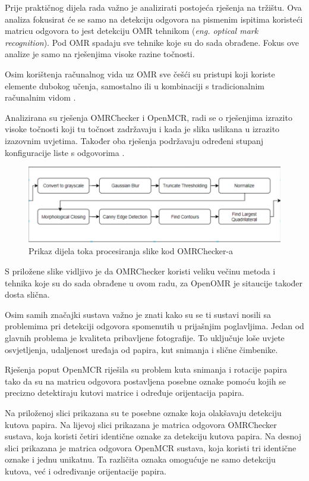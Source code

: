 \documentclass{foi}
\begin{document}
Prije praktičnog dijela rada važno je analizirati postojeća rješenja na tržištu. Ova analiza fokusirat će se samo na detekciju odgovora na pismenim ispitima koristeći matricu odgovora to jest detekciju OMR tehnikom (\textit{eng. optical mark recognition}). Pod OMR spadaju sve tehnike koje su do sada obrađene. Fokus ove analize je samo na rješenjima visoke razine točnosti.

Osim korištenja računalnog vida uz OMR sve češći su pristupi koji koriste elemente dubokog učenja, samostalno ili u kombinaciji s tradicionalnim računalnim vidom \cite{OMRComparsion}.

Analizirana su rješenja OMRChecker i OpenMCR, radi se o rješenjima izrazito visoke točnosti koji tu točnost zadržavaju i kada je slika uslikana u izrazito izazovnim uvjetima. Također oba rješenja podržavaju određeni stupanj konfiguracije liste s odgovorima \cite{OMRComparsion}.

\begin{figure}[H]
    \centering
    \includegraphics[width=1.0\linewidth]{slike/omr_flow.png}
    \caption{Prikaz dijela toka procesiranja slike kod OMRChecker-a \cite{OMRChecker}}
\end{figure}

S priložene slike vidljivo je da OMRChecker koristi veliku večinu metoda i tehnika koje su do sada obrađene u ovom radu, za OpenOMR je sitaucije također dosta slična.

Osim samih značajki sustava važno je znati kako su se ti sustavi nosili sa problemima pri detekciji odgovora spomenutih u prijašnjim poglavljima. Jedan od glavnih problema je kvaliteta pribavljene fotografije. To uključuje loše uvjete osvjetljenja, udaljenost uređaja od papira, kut snimanja i slične čimbenike.

Rješenja poput OpenMCR riješila su problem kuta snimanja i rotacije papira tako da su na matricu odgovora postavljena posebne oznake pomoću kojih se precizno detektiraju kutovi matrice i određuje orijentacija papira.

Na priloženoj slici prikazana su te posebne oznake koja olakšavaju detekciju kutova papira. Na lijevoj slici prikazana je matrica odgovora OMRChecker sustava, koja koristi četiri identične oznake za detekciju kutova papira. Na desnoj slici prikazana je matrica odgovora OpenMCR sustava, koja koristi tri identične oznake i jednu unikatnu. Ta različita oznaka omogućuje ne samo detekciju kutova, već i određivanje orijentacije papira.
\end{document}
